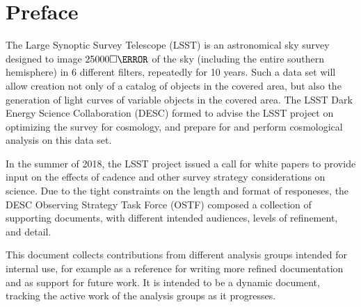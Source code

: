 \section*{Preface}

The Large Synoptic Survey Telescope (LSST) is an astronomical sky
survey designed to image $25000\square\degree$ of the sky (including
the entire southern hemisphere) in 6 different filters, repeatedly for
10 years. Such a data set will allow creation not only of a catalog of
objects in the covered area, but also the generation of light curves
of variable objects in the covered area. The LSST Dark Energy Science
Collaboration (DESC) formed to advise the LSST project on optimizing
the survey for cosmology, and prepare for and perform cosmological
analysis on this data set.

In the summer of 2018, the LSST project issued a call for white papers
to provide input on the effects of cadence and other survey strategy
considerations on science. Due to the tight constraints on the length
and format of responeses, the DESC Observing Strategy Task Force
(OSTF) composed a collection of supporting documents, with different
intended audiences, levels of refinement, and detail.

This document collects contributions from different analysis groups
intended for internal use, for example as a reference for writing more
refined documentation and as support for future work. It is intended to
be a dynamic document, tracking the active work of the analysis groups
as it progresses.
